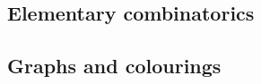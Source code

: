 
\subsection{Elementary combinatorics}


\begin{lemma}
  \label{lem:multibounds}
\end{lemma}

\subsection{Graphs and colourings}


\begin{definition}
  \label{def:complete-graph}
  \leanok
\end{definition}


\begin{definition}
  \label{def:edge-colouring}
  \leanok
\end{definition}

